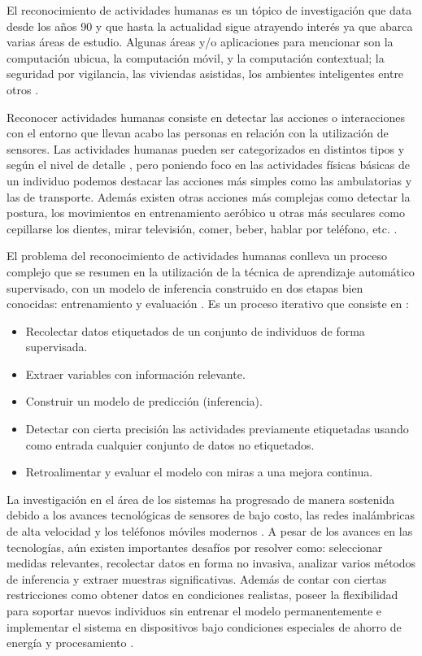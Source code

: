 \label{sec11:planteamiento}

El reconocimiento de actividades humanas es un tópico de investigación
que data desde los años 90 y que hasta la actualidad sigue atrayendo
interés ya que abarca varias áreas de estudio. Algunas áreas y/o aplicaciones
para mencionar son la computación ubicua, la computación móvil, y
la computación contextual; la seguridad por vigilancia, las viviendas
asistidas, los ambientes inteligentes entre otros \cite{Chen2012}. 

Reconocer actividades humanas consiste en detectar las acciones o
interacciones con el entorno que llevan acabo las personas en relación
con la utilización de sensores. Las actividades humanas pueden ser
categorizados en distintos tipos y según el nivel de detalle \cite{Chen2012},
pero poniendo foco en las actividades físicas básicas de un individuo
podemos destacar las acciones más simples como las ambulatorias y
las de transporte. Además existen otras acciones más complejas como
detectar la postura, los movimientos en entrenamiento aeróbico u otras
más seculares como cepillarse los dientes, mirar televisión, comer,
beber, hablar por teléfono, etc. \cite{LaraLabrador2013}.

El problema del reconocimiento de actividades humanas conlleva un
proceso complejo que se resumen en la utilización de la técnica de
aprendizaje automático supervisado, con un modelo de inferencia construido
en dos etapas bien conocidas: entrenamiento y evaluación \cite{LaraLabrador2013,Kwapisz2011}.
Es un proceso iterativo que consiste en \cite{Bao2004}:
\begin{itemize}
\item Recolectar datos etiquetados de un conjunto de individuos de forma
supervisada. 
\item Extraer variables con información relevante.
\item Construir un modelo de predicción (inferencia).
\item Detectar con cierta precisión las actividades previamente etiquetadas
usando como entrada cualquier conjunto de datos no etiquetados.
\item Retroalimentar y evaluar el modelo con miras a una mejora continua.
\end{itemize}
La investigación en el área de los sistemas  ha progresado
de manera sostenida debido a los avances tecnológicas de sensores
de bajo costo, las redes inalámbricas de alta velocidad y los teléfonos
móviles modernos \cite{Chen2012}. A pesar de los avances en las tecnologías,
aún existen importantes desafíos por resolver como: seleccionar medidas
relevantes, recolectar datos en forma no invasiva, analizar varios
métodos de inferencia y extraer muestras significativas. Además de
contar con ciertas restricciones como obtener datos en condiciones
realistas, poseer la flexibilidad para soportar nuevos individuos
sin entrenar el modelo permanentemente e implementar el sistema en
dispositivos bajo condiciones especiales de ahorro de energía y procesamiento
\cite{LaraLabrador2013}. 

